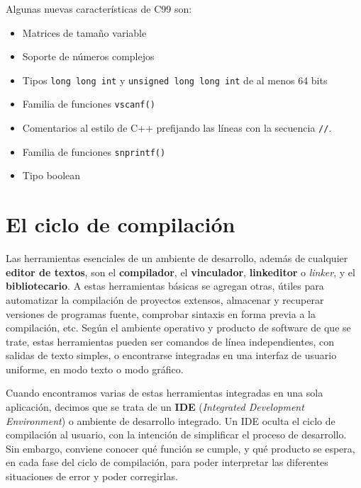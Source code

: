 Algunas nuevas características de C99 son: 

\begin{itemize}
\item Matrices de tamaño variable 
\item Soporte de números complejos 
\item Tipos \lstinline{long long int} y \lstinline{unsigned long long int} de al menos 64 bits 
\item Familia de funciones \lstinline{vscanf()} 
\item Comentarios al estilo de C++ prefijando las líneas con la secuencia \lstinline{//}. 
\item Familia de funciones \lstinline{snprintf()} 
\item Tipo boolean
\end{itemize}


\section{El ciclo de compilación}
Las herramientas esenciales de un ambiente de desarrollo, además de
cualquier \textbf{editor de textos}, son el \textbf{compilador}, el \textbf{vinculador}, 
\textbf{linkeditor} o \textit{linker}, y el \textbf{bibliotecario}. A
estas herramientas básicas se agregan otras, útiles para
automatizar la compilación de proyectos extensos, almacenar y
recuperar versiones de programas fuente, comprobar sintaxis en forma
previa a la compilación, etc. Según el ambiente operativo y
producto de software de que se trate, estas herramientas pueden ser comandos de línea independientes, con
salidas de texto simples, o encontrarse integradas en una interfaz de usuario uniforme, en modo
texto o modo gráfico. 

Cuando encontramos varias de estas herramientas integradas en una sola aplicación, decimos que se trata de un \textbf{IDE} (\textit{Integrated Development Environment}) o ambiente de desarrollo integrado. Un IDE oculta el ciclo de compilación al usuario, con la intención de simplificar el proceso de desarrollo. Sin embargo, conviene conocer qué función se cumple, y qué producto se espera, en cada fase del ciclo de compilación, para poder interpretar las diferentes situaciones de error y poder corregirlas.


